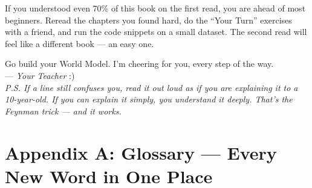 \documentclass[11pt,a4paper]{article}
\begin{document}
If you understood even 70\% of this book on the first read, you are ahead of
most beginners. Reread the chapters you found hard, do the ``Your Turn''
exercises with a friend, and run the code snippets on a small dataset. The
second read will feel like a different book --- an easy one.

Go build your World Model. I'm cheering for you, every step of the way.
\\[0.8em]
--- \emph{Your Teacher} \quad :) \\[0.6em]
{\small\textit{P.S. If a line still confuses you, read it out loud as if you
are explaining it to a 10-year-old. If you can explain it simply, you
understand it deeply. That's the Feynman trick --- and it works.}}

\newpage

\section*{Appendix A: Glossary --- Every New Word in One Place}
\end{document}
